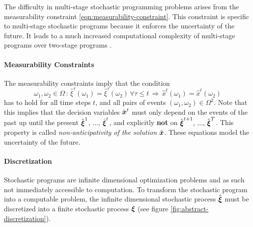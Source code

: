 The difficulty in multi-stage stochastic programming problems arises from the measurability constraint \eqref{eqn:measurability-constraint}.
This constraint is specific to multi-stage stochastic programs because it enforces the uncertainty of the future. It leads to a much increased computational complexity of multi-stage programs over two-stage programs \cite{Shapiro2005,Shapiro2008}.
%
\paragraph{Measurability Constraints}
The measurability constraints imply that the condition
\begin{equation}
  \label{eq:mathematical-NAC}
  \omega_1,\omega_2\in \Omega \, : \, \hat{\xi}^\tau(\omega_1) = \hat{\xi}^\tau(\omega_2)\,\forall \tau\leq t\,\Rightarrow \,  \hat{x}^t(\omega_1) =  \hat{x}^t(\omega_2)
\end{equation}
has to hold for all time steps $t$, and all pairs of events $(\omega_1,\omega_2)\in\Omega^2$.
Note that this implies that the decision variables $\hat{\boldsymbol x}^t$ must only depend on the events of the past up until the present $\hat{\boldsymbol\xi}^1$, ..., $\hat{\boldsymbol\xi}^t$, and explicitly \textbf{not} on $\hat{\boldsymbol\xi}^{t+1},\, ...,\,\hat{\boldsymbol\xi}^T$.
This property is called \textit{non-anticipativity of the solution} $\hat{\boldsymbol x}$.
These equations model the uncertainty of the future.
%
\paragraph{Discretization}
%
Stochastic programs are infinite dimensional optimization problems and as such not immediately accessible to computation.
To transform the stochastic program into a computable problem, the infinite dimensional stochastic process $\hat{\boldsymbol\xi}$ must be discretized into a finite stochastic process $\boldsymbol\xi$ (see figure \ref{fig:abstract-discretization}).

